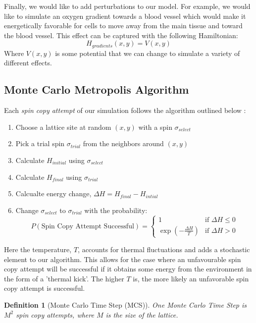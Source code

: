 \documentclass[12pt]{article}
\newtheorem{definition}{Definition}
\begin{document}
Finally, we would like to add perturbations to our model. For example, we would like to simulate an oxygen gradient towards a blood vessel which would make it energetically favorable for cells to move away from the main tissue and toward the blood vessel. This effect can be captured with the following Hamiltonian:
\begin{equation}
	H_{gradients}(x,y) = V(x,y)
\end{equation}
Where $V(x,y)$ is some potential that we can change to simulate a variety of different effects.

\subsection{Monte Carlo Metropolis Algorithm}
Each \emph{spin copy attempt} of our simulation follows the algorithm outlined below \cite{Glazier2007}:

\begin{enumerate}
  \item Choose a lattice site at random $(x,y)$ with a spin $\sigma_{select}$
  \item Pick a trial spin $\sigma_{trial}$ from the neighbors around $(x,y)$
  \item Calculate $H_{initial}$ using $\sigma_{select}$
  \item Calculate $H_{final}$ using $\sigma_{trial}$
  \item Calcualte energy change, $\Delta H = H_{final} - H_{intial}$
  \item{ Change $\sigma_{select}$ to $\sigma_{trial}$ with the probability:
  \begin{equation}
 		P(\text{Spin Copy Attempt Successful}) =
  	\begin{cases}
   		1 & \text{if } \Delta H \leq 0 \\
   		\exp{(-\frac{\Delta H}{T})}       & \text{if } \Delta H > 0
  	\end{cases}
  	\label{p_attempt_success}
	\end{equation}
}
\end{enumerate}

Here the temperature, $T$, accounts for thermal fluctuations and adds a stochastic element to our algorithm. This allows for the case where an unfavourable spin copy attempt will be successful if it obtains some energy from the environment in the form of a 'thermal kick'. The higher $T$ is, the more likely an unfavorable spin copy attempt is successful.

\begin{definition}[Monte Carlo Time Step (MCS)] One Monte Carlo Time Step is $M^2$ spin copy attempts, where $M$ is the size of the lattice.
\end{definition}
\end{document}
